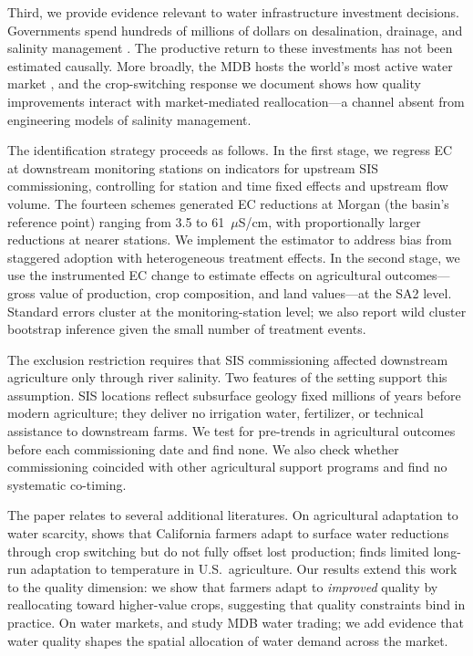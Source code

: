 \documentclass[12pt]{article}
\begin{document}
Third, we provide evidence relevant to water infrastructure investment decisions. Governments spend hundreds of millions of dollars on desalination, drainage, and salinity management \citep{hart2020salinity}. The productive return to these investments has not been estimated causally. More broadly, the MDB hosts the world's most active water market \citep{wheeler2014water}, and the crop-switching response we document shows how quality improvements interact with market-mediated reallocation---a channel absent from engineering models of salinity management.

The identification strategy proceeds as follows. In the first stage, we regress EC at downstream monitoring stations on indicators for upstream SIS commissioning, controlling for station and time fixed effects and upstream flow volume. The fourteen schemes generated EC reductions at Morgan (the basin's reference point) ranging from 3.5 to 61~$\mu$S/cm, with proportionally larger reductions at nearer stations. We implement the \citet{callaway2021difference} estimator to address bias from staggered adoption with heterogeneous treatment effects. In the second stage, we use the instrumented EC change to estimate effects on agricultural outcomes---gross value of production, crop composition, and land values---at the SA2 level. Standard errors cluster at the monitoring-station level; we also report wild cluster bootstrap inference given the small number of treatment events.

The exclusion restriction requires that SIS commissioning affected downstream agriculture only through river salinity. Two features of the setting support this assumption. SIS locations reflect subsurface geology fixed millions of years before modern agriculture; they deliver no irrigation water, fertilizer, or technical assistance to downstream farms. We test for pre-trends in agricultural outcomes before each commissioning date and find none. We also check whether commissioning coincided with other agricultural support programs and find no systematic co-timing.

The paper relates to several additional literatures. On agricultural adaptation to water scarcity, \citet{hagerty2022adaptation} shows that California farmers adapt to surface water reductions through crop switching but do not fully offset lost production; \citet{burke2016adaptation} finds limited long-run adaptation to temperature in U.S.\ agriculture. Our results extend this work to the quality dimension: we show that farmers adapt to \emph{improved} quality by reallocating toward higher-value crops, suggesting that quality constraints bind in practice. On water markets, \citet{grafton2018economics} and \citet{zuo2016effects} study MDB water trading; we add evidence that water quality shapes the spatial allocation of water demand across the market.
\end{document}
